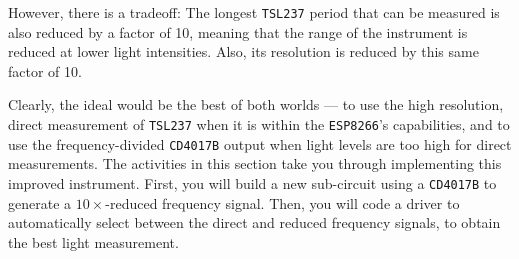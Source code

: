 However, there is a tradeoff:
The longest \texttt{TSL237} period that can be measured is also reduced by a factor of 10, meaning that the range of the instrument is reduced at lower light intensities.
Also, its resolution is reduced by this same factor of 10.

Clearly, the ideal would be the best of both worlds --- to use the high resolution, direct measurement of \texttt{TSL237} when it is within the \texttt{ESP8266}'s capabilities, and to use the frequency-divided \texttt{CD4017B} output when light levels are too high for direct measurements.
The activities in this section take you through implementing this improved instrument. 
First, you will build a new sub-circuit using a \texttt{CD4017B} to generate a $10\times$-reduced frequency signal.
Then, you will code a driver to automatically select between the direct and reduced frequency signals, to obtain the best light measurement.
 

